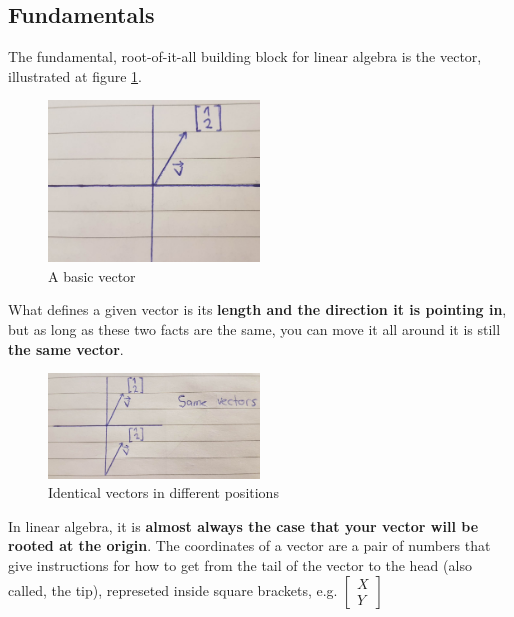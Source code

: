 \documentclass{article}
\begin{document}
\maketitle
\tableofcontents

\begin{center}
    \section{Fundamentals}
\end{center}

The fundamental, root-of-it-all building block for linear algebra is the vector, illustrated at figure \ref{fig1}.

\begin{figure}[h]
    \centering
    \includegraphics[width=0.5\textwidth, height=0.35\textwidth]{la_1.png}
    \caption{A basic vector}
    \label{fig1}
\end{figure}

What defines a given vector is its \textbf{length and the direction it is pointing in}, but as long as these two facts are the same, you can move it all around it is still \textbf{the same vector}. 

\begin{figure}[h]
    \centering
    \includegraphics[width=0.5\textwidth, height=0.35\textwidth]{la_2.png}
    \caption{Identical vectors in different positions}
    \label{fig2}
\end{figure}

In linear algebra, it is \textbf{almost always the case that your vector will be rooted at the origin}. The coordinates of a vector are a pair of numbers that give instructions for how to get from the tail of the vector to the head (also called, the tip), represeted inside square brackets, e.g. $\begin{bmatrix} X \\ Y \end{bmatrix}$
\end{document}
